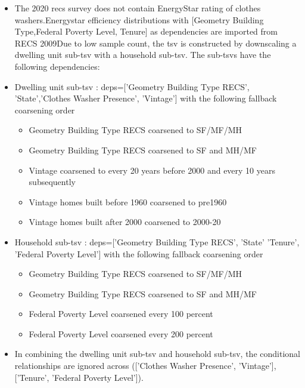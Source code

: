 \begin{itemize}
\item The 2020 recs survey does not contain EnergyStar rating of clothes washers.Energystar efficiency distributions with [Geometry Building Type,Federal Poverty Level, Tenure] as dependencies are imported from RECS 2009Due to low sample count, the tsv is constructed by downscaling a dwelling unit sub-tsv with a household sub-tsv. The sub-tsvs have the following dependencies:
\item Dwelling unit sub-tsv : deps=['Geometry Building Type RECS', 'State','Clothes Washer Presence', 'Vintage'] with the following fallback coarsening order
  \begin{itemize}
  \item [1] Geometry Building Type RECS coarsened to SF/MF/MH
  \item [2] Geometry Building Type RECS coarsened to SF and MH/MF
  \item [3] Vintage coarsened to every 20 years before 2000 and every 10 years subsequently
  \item [4] Vintage homes built before 1960 coarsened to pre1960
  \item [5] Vintage homes built after 2000 coarsened to 2000-20
  \end{itemize}
\item Household sub-tsv : deps=['Geometry Building Type RECS', 'State' 'Tenure', 'Federal Poverty Level'] with the following fallback coarsening order
  \begin{itemize}
  \item [1] Geometry Building Type RECS coarsened to SF/MF/MH
  \item [2] Geometry Building Type RECS coarsened to SF and MH/MF
  \item [3] Federal Poverty Level coarsened every 100 percent
  \item [4] Federal Poverty Level coarsened every 200 percent
  \end{itemize}
\item In combining the dwelling unit sub-tsv and household sub-tsv, the conditional relationships are ignored across (['Clothes Washer Presence', 'Vintage'], ['Tenure', 'Federal Poverty Level']).
\end{itemize}
